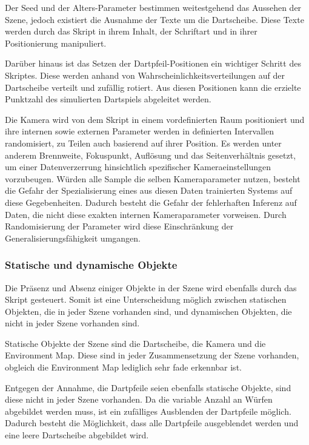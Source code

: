 Der Seed und der Alters-Parameter bestimmen weitestgehend das Aussehen der Szene, jedoch existiert die Ausnahme der Texte um die Dartscheibe. Diese Texte werden durch das Skript in ihrem Inhalt, der Schriftart und in ihrer Positionierung manipuliert.

Darüber hinaus ist das Setzen der Dartpfeil-Positionen ein wichtiger Schritt des Skriptes. Diese werden anhand von Wahrscheinlichkeitsverteilungen auf der Dartscheibe verteilt und zufällig rotiert. Aus diesen Positionen kann die erzielte Punktzahl des simulierten Dartspiels abgeleitet werden.

Die Kamera wird von dem Skript in einem vordefinierten Raum positioniert und ihre internen sowie externen Parameter werden in definierten Intervallen randomisiert, zu Teilen auch basierend auf ihrer Position. Es werden unter anderem Brennweite, Fokuspunkt, Auflösung und das Seitenverhältnis gesetzt, um einer Datenverzerrung hinsichtlich spezifischer Kameraeinstellungen vorzubeugen. Würden alle Sample die selben Kameraparameter nutzen, besteht die Gefahr der Spezialisierung eines aus diesen Daten trainierten Systems auf diese Gegebenheiten. Dadurch besteht die Gefahr der fehlerhaften Inferenz auf Daten, die nicht diese exakten internen Kameraparameter vorweisen. Durch Randomisierung der Parameter wird diese Einschränkung der Generalisierungsfähigkeit umgangen.

\subsubsection{Statische und dynamische Objekte}

Die Präsenz und Absenz einiger Objekte in der Szene wird ebenfalls durch das Skript gesteuert. Somit ist eine Unterscheidung möglich zwischen statischen Objekten, die in jeder Szene vorhanden sind, und dynamischen Objekten, die nicht in jeder Szene vorhanden sind.

Statische Objekte der Szene sind die Dartscheibe, die Kamera und die Environment Map. Diese sind in jeder Zusammensetzung der Szene vorhanden, obgleich die Environment Map lediglich sehr fade erkennbar ist.

Entgegen der Annahme, die Dartpfeile seien ebenfalls statische Objekte, sind diese nicht in jeder Szene vorhanden. Da die variable Anzahl an Würfen abgebildet werden muss, ist ein zufälliges Ausblenden der Dartpfeile möglich. Dadurch besteht die Möglichkeit, dass alle Dartpfeile ausgeblendet werden und eine leere Dartscheibe abgebildet wird.


